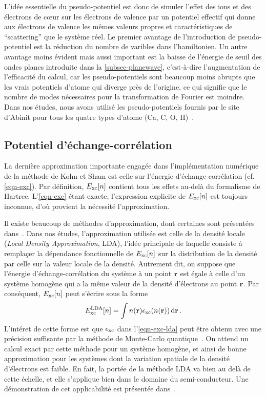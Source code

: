L'idée essentielle du pseudo-potentiel est donc de simuler l'effet des ions et des électrons de cœur
sur les électrons de valence par un potentiel effectif qui donne aux électrons de valence
les mêmes valeurs propres et caractéristiques de ``scattering'' que le système réel.
Le premier avantage de l'introduction de pseudo-potentiel est la réduction du nombre de varibles dans l'hamiltonien.
Un autre avantage moins évident mais aussi important est la baisse de l'énergie de seuil des ondes planes introduite dans la \cref{subsec-planewave},
c'est-à-dire l'augmentation de l'efficacité du calcul, car les pseudo-potentiels sont beaucoup moins abrupts
que les vrais potentiels d'atome qui diverge près de l'origine,
ce qui signifie que le nombre de modes nécessaires pour la transformation de Fourier est moindre.
Dans nos études, nous avons utilisé les pseudo-potentiels fournis par le site d'Abinit pour tous les
quatre types d'atome (Ca, C, O, H)~\cite{Pseudo}.

\subsection{Potentiel d'échange-corrélation}
\label{subsec-xc}
La dernière approximation importante engagée dans l'implémentation numérique
de la méthode de Kohn et Sham est celle sur l'énergie d'échange-corrélation (cf. \cref{eqn-exc}).
Par définition, $E_{\textnormal{xc}}[n]$ contient tous les effets au-delà du formalisme de Hartree.
L'\cref{eqn-exc} étant exacte, l'expression explicite de $E_{\textnormal{xc}}[n]$ est toujours inconnue,
d'où provient la nécessité l'approximation.

Il existe beaucoup de méthodes d'approximation,
dont certaines sont présentées dans~\cite{Sottile2003}.
Dans nos études, l'approximation utilisée est celle de la densité locale (\textit{Local Density Approximation}, LDA),
l'idée principale de laquelle consiste à remplaçer la dépendance fonctionnelle de $E_{\textnormal{xc}}[n]$
sur la distribution de la densité par celle sur la valeur locale de la densité.
Autrement dit, on suppose que l'énergie d'échange-corrélation du système à un point $\vb{r}$
est égale à celle d'un système homogène qui a la même valeur de la densité d'électrons au point $\vb{r}$.
Par conséquent, $E_{\textnormal{xc}}[n]$ peut s'écrire sous la forme
\begin{equation}
  \label{eqn-exc-lda}
  E_{\textnormal{xc}}^{\textnormal{LDA}}[n] = \int n(\vb{r})\epsilon_{\textnormal{xc}}(n(\vb{r})) \dd{\vb{r}}.
\end{equation}
L'intéret de cette forme est que $\epsilon_{\textnormal{xc}}$ dans l'\cref{eqn-exc-lda} peut être obtenu avec
une précision suffisante par la méthode de Monte-Carlo quantique~\cite{ceperley1980}.
On attend un calcul exact par cette méthode pour un système homogène,
et ainsi de bonne approximation pour les systèmes dont la variation spatiale de la densité d'électrons est faible.
En fait, la portée de la méthode LDA va bien au delà de cette échelle,
et elle s'applique bien dans le domaine du semi-conducteur.
Une démonstration de cet applicabilité est présentée dans~\cite{Sottile2003}.

